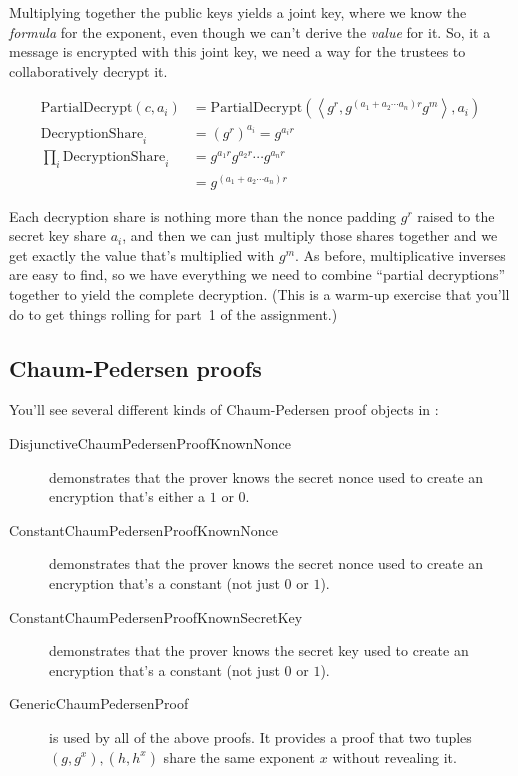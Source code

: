 Multiplying together the public keys yields a joint key, where we know
the {\em formula} for the exponent, even though we can't derive the
{\em value} for it. So, it a message is encrypted with this joint key,
we need a way for the trustees to collaboratively decrypt it.

\begin{align*}
\mathrm{PartialDecrypt}(c, a_i) &= \mathrm{PartialDecrypt}\left(\left<g^r, g^{(a_1 + a_2 \cdots a_n)r}g^m\right>,a_i\right) \\
\mathrm{DecryptionShare}_i &= ({g^r})^{a_i} = g^{a_ir} \\
\prod_i \mathrm{DecryptionShare}_i &= g^{a_1r}g^{a_2r}\cdots g^{a_nr} \\
&= g^{(a_1 + a_2 \cdots a_n)r}
\end{align*}

Each decryption share is nothing more than the nonce padding $g^r$
raised to the secret key share $a_i$, and then we can just multiply
those shares together and we get exactly the value that's multiplied
with $g^m$. As before, multiplicative inverses are easy to find, so
we have everything we need to combine ``partial decryptions'' together
to yield the complete decryption. (This is a warm-up exercise that
you'll do to get things rolling for part~1 of the assignment.)


\subsection{Chaum-Pedersen proofs}
\label{sec:chaum-pedersen}
You'll see several different kinds of Chaum-Pedersen proof objects
in :
\begin{description}
\item[DisjunctiveChaumPedersenProofKnownNonce] demonstrates that the prover knows
  the secret nonce used to create an encryption that's either a $1$ or $0$.
\item[ConstantChaumPedersenProofKnownNonce] demonstrates that the prover
  knows the secret nonce used to create an encryption that's a
  constant (not just $0$ or $1$).
\item[ConstantChaumPedersenProofKnownSecretKey] demonstrates that the prover
  knows the secret key used to create an encryption that's a
  constant (not just $0$ or $1$).
\item[GenericChaumPedersenProof]
  is used by all of the above proofs. It provides a proof that two
  tuples $(g, g^x), (h, h^x)$ share the same exponent $x$ without
  revealing it.
\end{description}

